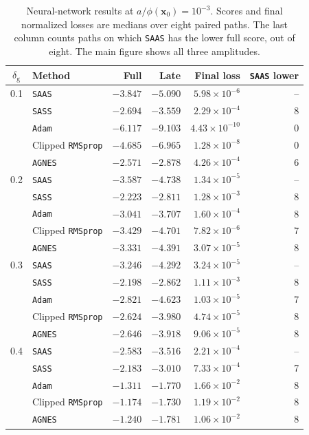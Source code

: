 \documentclass{article}
\begin{document}
\begin{table}[H]
\centering
\caption{Neural-network results at \(a/\phi(\bm x_0)=10^{-3}\).
Scores and final normalized losses are medians over eight paired paths.
The last column counts paths on which \texttt{SAAS} has the lower full
score, out of eight. The main figure shows all three amplitudes.}
\label{tab:exp_nn_comparison_summary}

\small
\setlength{\tabcolsep}{5pt}
\renewcommand{\arraystretch}{1.08}
\begin{tabularx}{\linewidth}{@{}cXrrrr@{}}
\toprule
\(\delta_{\mathrm g}\) & Method & Full & Late & Final loss & \texttt{SAAS} lower\\
\midrule
0.1 & \texttt{SAAS} & \(-3.847\) & \(-5.090\) & \(5.98\times10^{-6}\) & --\\
& \texttt{SASS} & \(-2.694\) & \(-3.559\) & \(2.29\times10^{-4}\) & 8\\
& \texttt{Adam} & \(-6.117\) & \(-9.103\) & \(4.43\times10^{-10}\) & 0\\
& Clipped \texttt{RMSprop} & \(-4.685\) & \(-6.965\) & \(1.28\times10^{-8}\) & 0\\
& \texttt{AGNES} & \(-2.571\) & \(-2.878\) & \(4.26\times10^{-4}\) & 6\\
\midrule
0.2 & \texttt{SAAS} & \(-3.587\) & \(-4.738\) & \(1.34\times10^{-5}\) & --\\
& \texttt{SASS} & \(-2.223\) & \(-2.811\) & \(1.28\times10^{-3}\) & 8\\
& \texttt{Adam} & \(-3.041\) & \(-3.707\) & \(1.60\times10^{-4}\) & 8\\
& Clipped \texttt{RMSprop} & \(-3.429\) & \(-4.701\) & \(7.82\times10^{-6}\) & 7\\
& \texttt{AGNES} & \(-3.331\) & \(-4.391\) & \(3.07\times10^{-5}\) & 8\\
\midrule
0.3 & \texttt{SAAS} & \(-3.246\) & \(-4.292\) & \(3.24\times10^{-5}\) & --\\
& \texttt{SASS} & \(-2.198\) & \(-2.862\) & \(1.11\times10^{-3}\) & 8\\
& \texttt{Adam} & \(-2.821\) & \(-4.623\) & \(1.03\times10^{-5}\) & 7\\
& Clipped \texttt{RMSprop} & \(-2.624\) & \(-3.980\) & \(4.74\times10^{-5}\) & 8\\
& \texttt{AGNES} & \(-2.646\) & \(-3.918\) & \(9.06\times10^{-5}\) & 8\\
\midrule
0.4 & \texttt{SAAS} & \(-2.583\) & \(-3.516\) & \(2.21\times10^{-4}\) & --\\
& \texttt{SASS} & \(-2.183\) & \(-3.010\) & \(7.33\times10^{-4}\) & 7\\
& \texttt{Adam} & \(-1.311\) & \(-1.770\) & \(1.66\times10^{-2}\) & 8\\
& Clipped \texttt{RMSprop} & \(-1.174\) & \(-1.730\) & \(1.19\times10^{-2}\) & 8\\
& \texttt{AGNES} & \(-1.240\) & \(-1.781\) & \(1.06\times10^{-2}\) & 8\\
\bottomrule
\end{tabularx}
\end{table}
\end{document}
